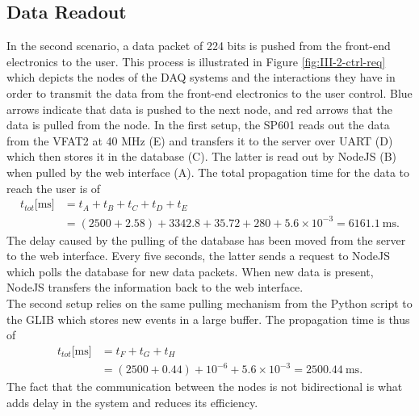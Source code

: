     \subsection{Data Readout}

      In the second scenario, a data packet of 224 bits is pushed from the front-end electronics to the user. This process is illustrated in Figure \ref{fig:III-2-ctrl-req} which depicts the nodes of the DAQ systems and the interactions they have in order to transmit the data from the front-end electronics to the user control. Blue arrows indicate that data is pushed to the next node, and red arrows that the data is pulled from the node. In the first setup, the SP601 reads out the data from the VFAT2 at 40 MHz (E) and transfers it to the server over UART (D) which then stores it in the database (C). The latter is read out by NodeJS (B) when pulled by the web interface (A). The total propagation time for the data to reach the user is of
      \begin{equation}
        \begin{split}
          t_{tot}\text{[ms]} & = t_A + t_B + t_C + t_D + t_E \\
                             & = (2500 + 2.58) + 3342.8 + 35.72 + 280 + 5.6 \times 10^{-3} = 6161.1 \ \text{ms}.
        \end{split}
      \end{equation}
      The delay caused by the pulling of the database has been moved from the server to the web interface. Every five seconds, the latter sends a request to NodeJS which polls the database for new data packets. When new data is present, NodeJS transfers the information back to the web interface. \\

      The second setup relies on the same pulling mechanism from the Python script to the GLIB which stores new events in a large buffer. The propagation time is thus of
      \begin{equation}
        \begin{split}
          t_{tot}\text{[ms]} & = t_F + t_G + t_H \\
                             & = (2500 + 0.44) + 10^{-6} + 5.6 \times 10^{-3} = 2500.44 \ \text{ms}.
        \end{split}
      \end{equation}
      The fact that the communication between the nodes is not bidirectional is what adds delay in the system and reduces its efficiency. \\

